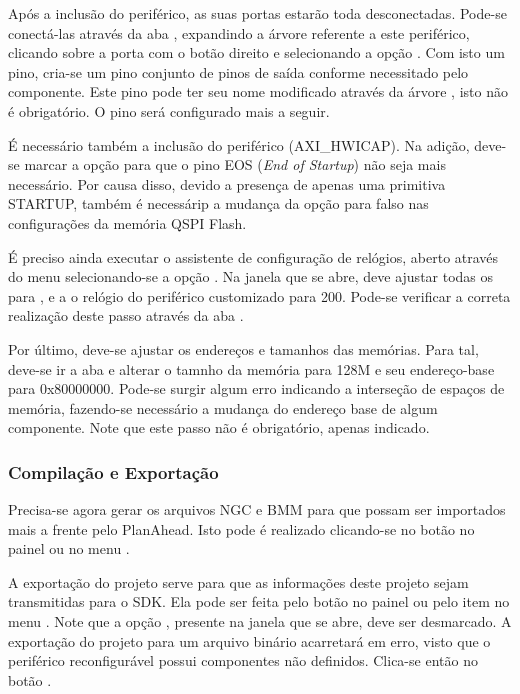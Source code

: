 \documentclass[11pt,a4paper,oneside]{book}
\begin{document}
Após a inclusão do periférico, as suas portas estarão toda desconectadas.
Pode-se conectá-las através da aba , expandindo a árvore referente a este periférico, clicando sobre a porta  com o botão direito e selecionando a opção .
Com isto um pino, cria-se um pino conjunto de pinos de saída conforme necessitado pelo componente.
Este pino pode ter seu nome modificado através da árvore , isto não é obrigatório.
O pino  será configurado mais a seguir.

É necessário também a inclusão do periférico  (AXI\_\-HW\-ICAP).
Na adição, deve-se marcar a opção  para que o pino EOS (\textit{End of Startup}) não seja mais necessário.
Por causa disso, devido a presença de apenas uma primitiva STARTUP, também é necessárip a mudança da opção  para falso nas configurações da memória QSPI Flash.

É preciso ainda executar o assistente de configuração de relógios, aberto através do menu  selecionando-se a opção .
Na janela que se abre, deve ajustar todas os  para , e a o relógio do periférico customizado  para 200.
Pode-se verificar a correta realização deste passo através da aba .

Por último, deve-se ajustar os endereços e tamanhos das memórias.
Para tal, deve-se ir a aba  e alterar o tamnho da memória  para 128M e seu endereço-base para 0x80000000.
Pode-se surgir algum erro indicando a interseção de espaços de memória, fazendo-se necessário a mudança do endereço base de algum componente.
Note que este passo não é obrigatório, apenas indicado.

\subsubsection{Compilação e Exportação}
Precisa-se agora gerar os arquivos NGC e BMM para que possam ser importados mais a frente pelo PlanAhead.
Isto pode é realizado clicando-se no botão  no painel  ou no menu .

A exportação do projeto serve para que as informações deste projeto sejam transmitidas para o SDK.
Ela pode ser feita pelo botão  no painel  ou pelo item  no menu .
Note que a opção , presente na janela que se abre, deve ser desmarcado.
A exportação do projeto para um arquivo binário acarretará em erro, visto que o periférico reconfigurável possui componentes não definidos.
Clica-se então no botão .
\end{document}
